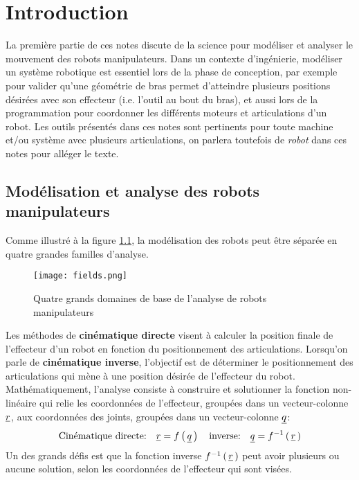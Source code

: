\chapter{Introduction}

La première partie de ces notes discute de la science pour modéliser et analyser le mouvement des robots manipulateurs. Dans un contexte d'ingénierie, modéliser un système robotique est essentiel lors de la phase de conception, par exemple pour valider qu'une géométrie de bras permet d'atteindre plusieurs positions désirées avec son effecteur (i.e. l'outil au bout du bras), et aussi lors de la programmation pour coordonner les différents moteurs et articulations d'un robot. Les outils présentés dans ces notes sont pertinents pour toute machine et/ou système avec plusieurs articulations, on parlera toutefois de \textit{robot} dans ces notes pour alléger le texte.


\section{Modélisation et analyse des robots manipulateurs}

Comme illustré à la figure \ref{fig:fields}, la modélisation des robots peut être séparée en quatre grandes familles d'analyse.

\begin{figure}[H]
	\centering
		\texttt{[image: fields.png]}
	\caption{Quatre grands domaines de base de l'analyse de robots manipulateurs  }
	\label{fig:fields}
\end{figure}

Les méthodes de \textbf{cinématique directe} visent à calculer la position finale de l'effecteur d'un robot en fonction du positionnement des articulations. Lorsqu'on parle de \textbf{cinématique inverse}, l'objectif est de déterminer le positionnement des articulations qui mène à une position désirée de l'effecteur du robot. Mathématiquement, l'analyse consiste à construire et solutionner la fonction non-linéaire qui relie les coordonnées de l'effecteur, groupées dans un vecteur-colonne $\underline{r}$, aux coordonnées des joints, groupées dans un vecteur-colonne $\underline{q}$:
\begin{equation}
\text{Cinématique directe:}  \quad \underline{r} = f\left( \, \underline{q} \, \right)  \quad  \text{inverse:} \quad \underline{q} = f^{-1}\left( \, \underline{r}  \, \right) 
\end{equation}
Un des grands défis est que la fonction inverse $f^{-1}\left( \, \underline{r}  \, \right)$ peut avoir plusieurs ou aucune solution, selon les coordonnées de l'effecteur qui sont visées. 

